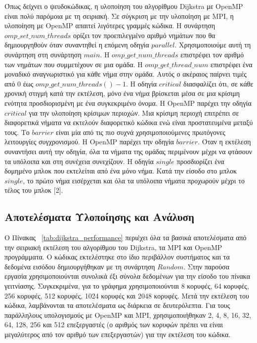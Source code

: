 \documentclass[12pt,a4paper]{article}
\begin{document}
Όπως δείχνει ο ψευδοκώδικας, η υλοποίηση του αλγορίθμου  \foreignlanguage{english}{Dijkstra} με \foreignlanguage{english}{OpenMP} είναι πολύ παρόμοια με τη σειριακή. 
Σε σύγκριση με την υλοποίηση με \foreignlanguage{english}{MPI}, η υλοποίηση με \foreignlanguage{english}{OpenMP} απαιτεί λιγότερες γραμμές κώδικα.
Η συνάρτηση \texttt{$omp\_set\_num\_threads$} ορίζει τον προεπιλεγμένο αριθμό νημάτων που θα δημιουργηθούν όταν συναντηθεί η επόμενη οδηγία \texttt{$parallel$}. Χρησιμοποιούμε αυτή τη συνάρτηση στη συνάρτηση \texttt{$main$}.
Η \texttt{$omp\_get\_num\_threads$} επιστρέφει τον αριθμό των νημάτων που συμμετέχουν σε μια ομάδα. Η \texttt{$omp\_get\_thread\_num$} επιστρέφει ένα μοναδικό αναγνωριστικό για κάθε νήμα στην ομάδα. Αυτός ο ακέραιος παίρνει τιμές από $0$ έως \texttt{$omp\_get\_num\_threads()-1$}.
Η οδηγία \texttt{$critical$} διασφαλίζει ότι, σε κάθε χρονική στιγμή κατά την εκτέλεση, μόνο ένα νήμα βρίσκεται μέσα σε μια κρίσιμη ενότητα προσδιορισμένη με ένα συγκεκριμένο όνομα.
Η \foreignlanguage{english}{OpenMP} παρέχει την οδηγία \texttt{$critical$} για την υλοποίηση κρίσιμων περιοχών. Μια κρίσιμη περιοχή επιτρέπει σε διαφορετικά νήματα να εκτελούν διαφορετικό κώδικα ενώ είναι προστατευμένα μεταξύ τους.
Το \texttt{$barrier$} είναι μία από τις πιο συχνά χρησιμοποιούμενες πρωτόγονες λειτουργίες συγχρονισμού. Η \foreignlanguage{english}{OpenMP} παρέχει την οδηγία \texttt{$barrier$}. Όταν η εκτέλεση συναντήσει αυτή την οδηγία, όλα τα νήματα της ομάδας περιμένουν μέχρι να φτάσουν τα υπόλοιπα και στη συνέχεια συνεχίζουν.
Η οδηγία \texttt{$single$} προσδιορίζει ένα δομημένο μπλοκ που εκτελείται από ένα μόνο νήμα. Κατά την είσοδο στο μπλοκ \texttt{$single$}, το πρώτο νήμα εισέρχεται και όλα τα υπόλοιπα νήματα προχωρούν μέχρι το τέλος του μπλοκ [2].
\vspace{0.5cm}

\subsection{Αποτελέσματα Υλοποίησης και Ανάλυση}

Ο Πίνακας ~\ref{tab:dijkstra_performance} περιέχει όλα τα βασικά αποτελέσματα από την σειριακή εκτέλεση του αλγορίθμου του \foreignlanguage{english}{Dijkstra}, τα \foreignlanguage{english}{MPI} και \foreignlanguage{english}{OpenMP} προγράμματα. Ο κώδικας εκτελέστηκε στο ίδιο περιβάλλον συστήματος και τα δεδομένα εισόδου δημιουργήθηκαν με τη συνάρτηση \texttt{$Random$}. Στην παρούσα εργασία χρησιμοποιούνται συνολικά έξι σύνολα δεδομένων για την είσοδο του πίνακα γειτνίασης. Συγκεκριμένα, για το γράφημα χρησιμοποιούνται 8 κορυφές, 64 κορυφές, 256 κορυφές, 512 κορυφές, 1024 κορυφές και 2048 κορυφές. Μετά την εκτέλεση του κώδικα, λαμβάνονται τα αποτελέσματα ως διάρκεια σε δευτερόλεπτα. Για τους παράλληλους υπολογισμούς με \foreignlanguage{english}{OpenMP} και \foreignlanguage{english}{MPI}, χρησιμοποιήθηκαν 2, 4, 8, 16, 32, 64, 128, 256 και 512 επεξεργαστές (ο αριθμός των κορυφών πρέπει να είναι μεγαλύτερος από τον αριθμό των επεξεργαστών) για την εκτέλεση του κώδικα.
\vspace{0.3cm}
\end{document}
